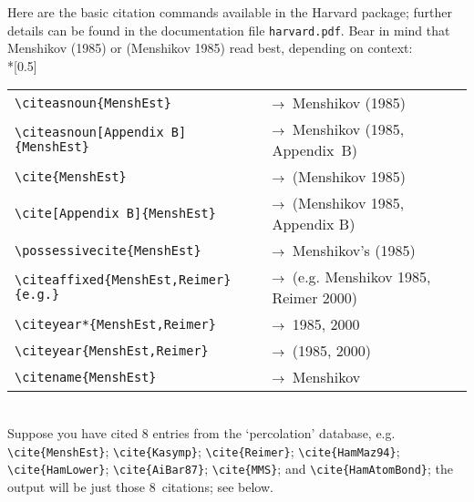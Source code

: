 Here are the basic citation commands available in the Harvard package; further details can be found in the documentation file \verb"harvard.pdf". Bear in mind that Menshikov (1985) or (Menshikov 1985) read best, depending on context:\\*[0.5\baselineskip]
\begin{tabular}{@{}ll@{}}
\verb"\citeasnoun{MenshEst}"
    & $\rightarrow\enskip$Menshikov (1985)\\
\verb"\citeasnoun[Appendix B]{MenshEst}"
    & $\rightarrow\enskip$Menshikov (1985, Appendix~B)\\
\verb"\cite{MenshEst}"
    & $\rightarrow\enskip$(Menshikov 1985)\\
\verb"\cite[Appendix B]{MenshEst}"
    & $\rightarrow\enskip$(Menshikov 1985, Appendix B)\\
\verb"\possessivecite{MenshEst}"
    & $\rightarrow\enskip$Menshikov's (1985)\\
\verb"\citeaffixed{MenshEst,Reimer}{e.g.}"
    & $\rightarrow\enskip$(e.g. Menshikov 1985, Reimer 2000)\\
\verb"\citeyear*{MenshEst,Reimer}"
    & $\rightarrow\enskip$1985, 2000\\
\verb"\citeyear{MenshEst,Reimer}"
    & $\rightarrow\enskip$(1985, 2000)\\
\verb"\citename{MenshEst}"
    & $\rightarrow\enskip$Menshikov
\end{tabular}\\[0.5\baselineskip]
%
\noindent Suppose you have cited 8 entries from the `percolation' database, e.g. \verb"\cite{MenshEst}"; \verb"\cite{Kasymp}"; \verb"\cite{Reimer}"; \verb"\cite{HamMaz94}"; \verb"\cite{HamLower}"; \verb"\cite{AiBar87}"; \verb"\cite{MMS}"; and \verb"\cite{HamAtomBond}"; the output will be just those 8~citations; see below.


